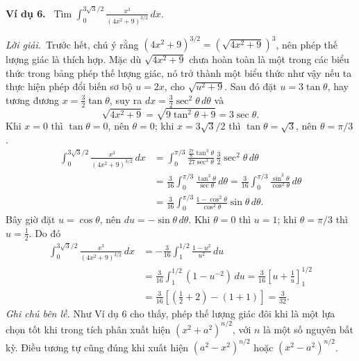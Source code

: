 \documentclass[12pt,a4paper]{article}
\newcommand{\ex}[1]{\par\medskip\noindent\textbf{Ví dụ #1.}\ }
\newcommand{\sol}{\par\nopagebreak[4]\noindent\textit{Lời giải.}\ }
\begin{document}
\ex{6} Tìm $\displaystyle\int_0^{3\sqrt3/2}\frac{x^3}{(4x^2+9)^{3/2}}\,dx$.
\sol Trước hết, chú ý rằng $(4x^2+9)^{3/2}=(\sqrt{4x^2+9})^3$, nên phép thế lượng giác là thích hợp. Mặc dù $\sqrt{4x^2+9}$ chưa hoàn toàn là một trong các biểu thức trong bảng phép thế lượng giác, nó trở thành một biểu thức như vậy nếu ta thực hiện phép đổi biến sơ bộ $u=2x$, cho $\sqrt{u^2+9}$. Sau đó đặt $u=3\tan\theta$, hay tương đương $x=\frac32\tan\theta$, suy ra $dx=\frac32\sec^2\theta\,d\theta$ và
\[\sqrt{4x^2+9}=\sqrt{9\tan^2\theta+9}=3\sec\theta.\]
Khi $x=0$ thì $\tan\theta=0$, nên $\theta=0$; khi $x=3\sqrt3/2$ thì $\tan\theta=\sqrt3$, nên $\theta=\pi/3$.
\begin{align*}
\int_0^{3\sqrt3/2}\frac{x^3}{(4x^2+9)^{3/2}}\,dx
&=\int_0^{\pi/3}\frac{\frac{27}{8}\tan^3\theta}{27\sec^3\theta}\,\frac32\sec^2\theta\,d\theta\\
&=\frac3{16}\int_0^{\pi/3}\frac{\tan^3\theta}{\sec\theta}\,d\theta
=\frac3{16}\int_0^{\pi/3}\frac{\sin^3\theta}{\cos^2\theta}\,d\theta\\
&=\frac3{16}\int_0^{\pi/3}\frac{1-\cos^2\theta}{\cos^2\theta}\sin\theta\,d\theta.
\end{align*}
Bây giờ đặt $u=\cos\theta$, nên $du=-\sin\theta\,d\theta$. Khi $\theta=0$ thì $u=1$; khi $\theta=\pi/3$ thì $u=\frac12$. Do đó
\begin{align*}
\int_0^{3\sqrt3/2}\frac{x^3}{(4x^2+9)^{3/2}}\,dx
&=-\frac3{16}\int_1^{1/2}\frac{1-u^2}{u^2}\,du\\
&=\frac3{16}\int_1^{1/2}(1-u^{-2})\,du
=\frac3{16}\left[u+\frac1u\right]_1^{1/2}\\
&=\frac3{16}\left[\left(\frac12+2\right)-(1+1)\right]=\frac3{32}.
\end{align*}
\textit{Ghi chú bên lề.} Như Ví dụ 6 cho thấy, phép thế lượng giác đôi khi là một lựa chọn tốt khi trong tích phân xuất hiện $(x^2+a^2)^{n/2}$, với $n$ là một số nguyên bất kỳ. Điều tương tự cũng đúng khi xuất hiện $(a^2-x^2)^{n/2}$ hoặc $(x^2-a^2)^{n/2}$.
\end{document}
